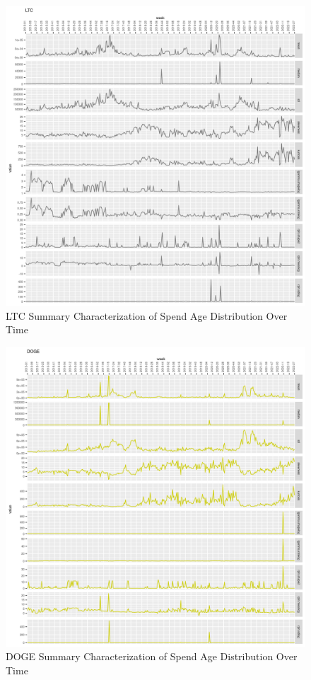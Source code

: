 \documentclass[english]{article}
\begin{document}
\begin{figure}[H]
\caption{LTC Summary Characterization of Spend Age Distribution Over Time}

\includegraphics[scale=0.9]{images/spend-age-summary-LTC}
\end{figure}

\begin{figure}[H]
\caption{DOGE Summary Characterization of Spend Age Distribution Over Time}
\label{figure-DOGE-Summary-Characterization}

\includegraphics[scale=0.9]{images/spend-age-summary-DOGE}
\end{figure}
\end{document}

